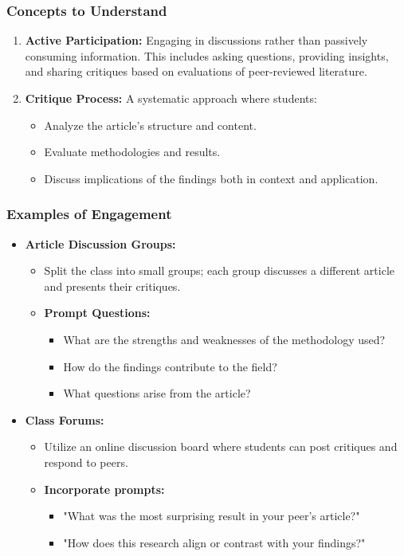 \documentclass[aspectratio=169]{beamer}
\begin{document}
\begin{frame}[fragile]
    \frametitle{Concepts to Understand}
    \begin{enumerate}
        \item \textbf{Active Participation:} Engaging in discussions rather than passively consuming information. This includes asking questions, providing insights, and sharing critiques based on evaluations of peer-reviewed literature.
        
        \item \textbf{Critique Process:} A systematic approach where students:
        \begin{itemize}
            \item Analyze the article's structure and content.
            \item Evaluate methodologies and results.
            \item Discuss implications of the findings both in context and application.
        \end{itemize}
    \end{enumerate}
\end{frame}

\begin{frame}[fragile]
    \frametitle{Examples of Engagement}
    \begin{itemize}
        \item \textbf{Article Discussion Groups:} 
        \begin{itemize}
            \item Split the class into small groups; each group discusses a different article and presents their critiques.
            \item \textbf{Prompt Questions:} 
            \begin{itemize}
                \item What are the strengths and weaknesses of the methodology used?
                \item How do the findings contribute to the field?
                \item What questions arise from the article?
            \end{itemize}
        \end{itemize}
        
        \item \textbf{Class Forums:} 
        \begin{itemize}
            \item Utilize an online discussion board where students can post critiques and respond to peers.
            \item \textbf{Incorporate prompts:} 
            \begin{itemize}
                \item "What was the most surprising result in your peer’s article?"
                \item "How does this research align or contrast with your findings?"
            \end{itemize}
        \end{itemize}
    \end{itemize}
\end{frame}
\end{document}
